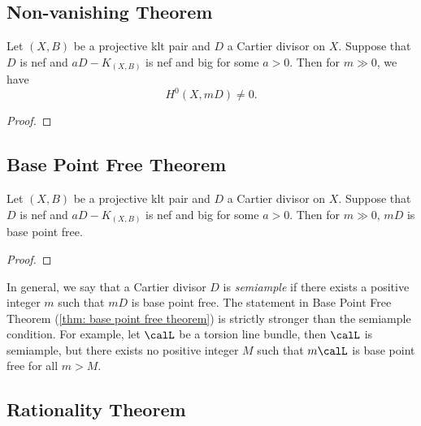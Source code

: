 \subsection{Non-vanishing Theorem}

    \begin{theorem}\label{thm: non-vanishing theorem}
        Let \((X,B)\) be a projective klt pair and \(D\) a Cartier divisor on \(X\).
        Suppose that \(D\) is nef and \(aD-K_{(X,B)}\) is nef and big for some \(a > 0\).
        Then for \(m \gg 0\), we have 
        \[ H^0(X,mD) \neq 0. \]
    \end{theorem}
    \begin{proof}
    \end{proof}

\subsection{Base Point Free Theorem}

    \begin{theorem}\label{thm: base point free theorem}
        Let \((X,B)\) be a projective klt pair and \(D\) a Cartier divisor on \(X\).
        Suppose that \(D\) is nef and \(aD-K_{(X,B)}\) is nef and big for some \(a > 0\).
        Then for \(m \gg 0\), \(mD\) is base point free.
    \end{theorem}
    \begin{proof}
    \end{proof}

    \begin{remark}\label{rmk:statement_in_BPF_theorem_stronger_than_semiample}
        In general, we say that a Cartier divisor \(D\) is \emph{semiample} if there exists a positive integer \(m\) such that \(mD\) is base point free.
        The statement in Base Point Free Theorem (\cref{thm: base point free theorem}) is strictly stronger than the semiample condition.
        For example, let \(\calL\) be a torsion line bundle, then \(\calL\) is semiample, but there exists no positive integer \(M\) such that \(m\calL\) is base point free for all \(m>M\).
    \end{remark}

\subsection{Rationality Theorem}

